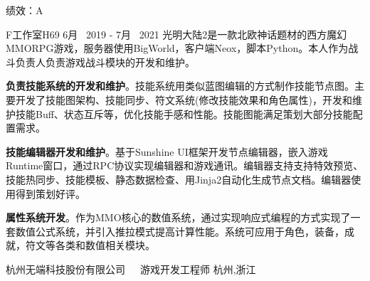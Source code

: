 \begin{cventries}
\cventrycompany
{绩效：A} %
{~} %

\cventryproject
{F工作室H69} %
{6月~ 2019 - 7月~ 2021} %
{光明大陆2是一款北欧神话题材的西方魔幻MMORPG游戏，服务器使用BigWorld，客户端Neox，脚本Python。本人作为战斗负责人负责游戏战斗模块的开发和维护。}
{ %
	\begin{cvitems}
		\item {\textbf{负责技能系统的开发和维护}。技能系统用类似蓝图编辑的方式制作技能节点图。主要开发了技能图架构、技能同步、符文系统(修改技能效果和角色属性)，开发和维护技能Buff、状态互斥等，优化技能手感和性能。技能图能满足策划大部分技能配置需求。}
		\item{\textbf{技能编辑器开发和维护}。基于Sunshine UI框架开发节点编辑器，嵌入游戏Runtime窗口，通过RPC协议实现编辑器和游戏通讯。编辑器支持支持特效预览、技能热同步、技能模板、静态数据检查、用Jinja2自动化生成节点文档。编辑器使用得到策划好评。}
		\item{\textbf{属性系统开发}。作为MMO核心的数值系统，通过实现响应式编程的方式实现了一套数值公式系统，并引入推拉模式提高计算性能。系统可应用于角色，装备，成就，符文等各类和数值相关模块。}
	\end{cvitems}
}



\cventrycompany
{杭州无端科技股份有限公司~~~游戏开发工程师} %
{杭州,浙江} %


\end{cventries}
